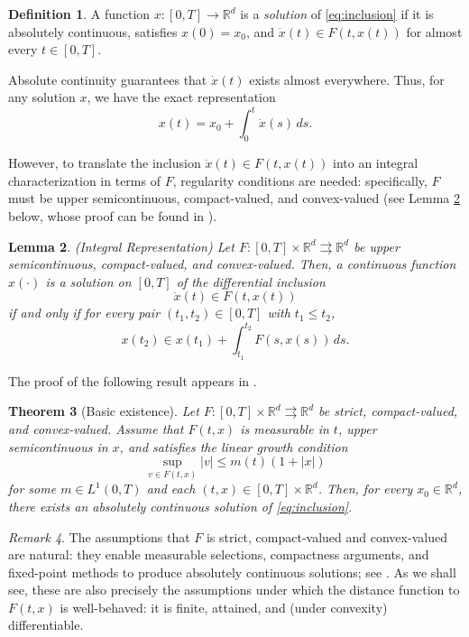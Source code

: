 \documentclass[11pt]{elsarticle}
\newtheorem{theorem}{Theorem}[section]
\newtheorem{lemma}[theorem]{Lemma}
\theoremstyle{definition}
\newtheorem{definition}[theorem]{Definition}
\theoremstyle{remark}
\newtheorem{remark}[theorem]{Remark}
\numberwithin{equation}{section}
\begin{document}
	\begin{definition}
		A function $x:[0,T]\to\mathbb{R}^d$ is a \emph{solution} of
		\eqref{eq:inclusion} if it is absolutely continuous, satisfies
		$x(0)=x_0$, and $\dot{x}(t)\in F(t,x(t))$ for almost every $t\in[0,T]$.
	\end{definition}
	
	Absolute continuity guarantees that $\dot{x}(t)$ 
	exists almost everywhere. Thus, for any solution $x$, we have 
	the exact representation
	\[
	x(t) = x_0 + \int_{0}^{t} \dot{x}(s) \, ds.
	\]
	
	
	However, to translate the inclusion $\dot{x}(t) \in F(t,x(t))$ into 
	an integral characterization in terms of $F$, regularity conditions 
	are needed: specifically, $F$ must be upper semicontinuous, compact-valued,
	and convex-valued (see Lemma \ref{lem:integral_repr} below, whose proof can be
	found in \cite[Lemma~1, p.\,99]{aubin_cellina_1984}).
	
	\begin{lemma}{\rm (Integral Representation)} \label{lem:integral_repr}
		Let $F:[0,T] \times \mathbb{R}^d \rightrightarrows \mathbb{R}^d$ be upper semicontinuous, compact-valued, and convex-valued. Then, a continuous function 
		$x(\cdot)$ is a solution on $[0,T]$ of the differential inclusion
		\[
		\dot{x}(t) \in F(t, x(t))
		\]
		if and only if for every pair $(t_1, t_2)\in [0,T]$ with $t_1 \le t_2$,
		\[
		x(t_2) \in x(t_1) + \int_{t_1}^{t_2} F(s, x(s)) \, ds.
		\]
	\end{lemma}
	
	The proof of the following result appears in
	\cite[Theorem~10.5, p.\,138]{deimling_1992}.
	
	\begin{theorem}[Basic existence]\label{thm:existence}
		Let $F:[0,T]\times\mathbb{R}^d\rightrightarrows\mathbb{R}^d$ be
		strict, compact-valued, and convex-valued. 
		Assume that $F(t,x)$ is measurable in $t$, upper semicontinuous in $x$,
		and satisfies the linear growth condition
		\[
		\sup_{v\in F(t,x)}|v|\le m(t)(1+|x|)
		\]
		for some $m\in L^1(0,T)$ and each $(t,x)\in [0,T]\times \mathbb{R}^d$.  Then, for every $x_0\in\mathbb{R}^d$, there
		exists an absolutely continuous solution of \eqref{eq:inclusion}.
	\end{theorem}
	
	\begin{remark}
		The assumptions that $F$ is strict, compact-valued and convex-valued are natural:
		they enable measurable selections, compactness arguments, and fixed-point
		methods to produce absolutely continuous solutions; see
		\cite{aubin_cellina_1984,aubin_frankowska_2009,deimling_1992}.  As we
		shall see, these are also precisely the assumptions under which the
		distance function to $F(t,x)$ is well-behaved: it is finite, attained,
		and (under convexity) differentiable.
	\end{remark}
	
\end{document}
